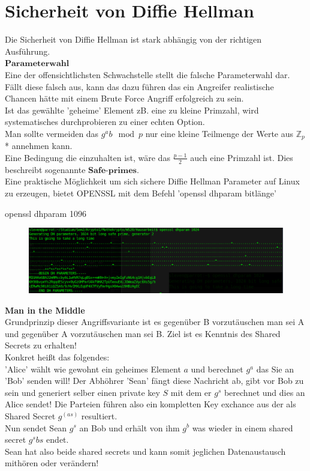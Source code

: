 \documentclass[a4paper,12pt]{scrartcl}
\begin{document}
\section{Sicherheit von Diffie Hellman}
Die Sicherheit von Diffie Hellman ist stark abhängig von der richtigen Ausführung.\\
\newline
$\textbf{Parameterwahl}$\\
Eine der offensichtlichsten Schwachstelle stellt die falsche Parameterwahl dar. Fällt diese falsch aus, kann das dazu führen das ein Angreifer realistische Chancen hätte mit einem Brute Force Angriff erfolgreich zu sein.\\
Ist das gewählte 'geheime' Element zB. eine zu kleine Primzahl, wird systematisches durchprobieren zu einer echten Option.\\
Man sollte vermeiden das $g^ab \mod p$ nur eine kleine Teilmenge der Werte aus $\mathbb{Z}_{p}$* annehmen kann.\\
Eine Bedingung die einzuhalten ist, wäre das $\frac{p-1}{2}$ auch eine Primzahl ist. Dies beschreibt sogenannte $\textbf{Safe-primes}$.\\
\newpage 
Eine praktische Möglichkeit um sich sichere Diffie Hellman Parameter auf Linux zu erzeugen, bietet OPENSSL mit dem Befehl 'openssl dhparam bitlänge'
\begin{center}
 openssl dhparam 1096

\end{center}
\begin{figure}[h]
\hspace{-1.6cm}
\includegraphics[scale=0.41]{dh}     
\end{figure}

\textbf{Man in the Middle} \\

Grundprinzip dieser Angriffsvariante ist es gegenüber B vorzutäuschen man sei A und gegenüber A vorzutäuschen man sei B.
Ziel ist es Kenntnis des Shared Secrets zu erhalten!\\
Konkret heißt das folgendes:\\
'Alice' wählt wie gewohnt ein geheimes Element $a$ und berechnet $g^a$ das Sie an 'Bob' senden will!
Der Abhöhrer 'Sean' fängt diese Nachricht ab, gibt vor Bob zu sein und generiert selber einen private key $S$ mit dem er $g^s$ berechnet und dies an Alice sendet! Die Parteien führen also ein kompletten Key exchance aus der als Shared Secret $g^(as)$ resultiert.\\
Nun sendet Sean $g^s$ an Bob und erhält von ihm $g^b$ was wieder in einem shared secret $g^sbs$ endet.\\
Sean hat also beide shared secrets und kann somit jeglichen Datenaustausch mithören oder verändern!\\
\end{document}
